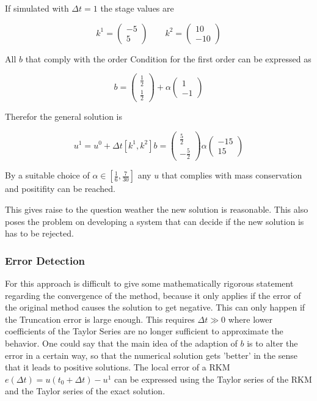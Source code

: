 \documentclass{article}
\begin{document}
If simulated with $\Delta t = 1$ the stage values are 

\begin{equation}
k^1 = \left(\begin{matrix}-5\\5\end{matrix}\right) \qquad k^2 = \left(\begin{matrix}10\\-10\end{matrix}\right)
\end{equation}

All $b$ that comply with the order Condition for the first order can be expressed as

\begin{equation}
b= \left(\begin{matrix}\frac{1}{2}\\ \frac{1}{2}\end{matrix}\right) + \alpha \left(\begin{matrix}1\\ -1\end{matrix}\right)
\end{equation}

Therefor the general solution is 

\begin{equation}
u^{1} = u^0 + \Delta t  \left[k^1,k^2\right] b = \left(\begin{matrix}\frac{5}{2}\\- \frac{5}{2}\end{matrix}\right) \alpha  \left(\begin{matrix}-15\\15\end{matrix}\right)
\end{equation}

By a suitable choice of $\alpha \in [\frac{1}{6},\frac{7}{30}]$ any $u$ that complies with mass conservation and positifity can be reached. 

This gives raise to the question weather the new solution is reasonable.
This also poses the problem on developing a system that can decide if the new solution is has to be rejected. 


 
\subsubsection{Error Detection}
For this approach is difficult to give some mathematically rigorous statement regarding the convergence of the method, because it only applies if the error of the original method causes the solution to get negative. This can only happen if the Truncation error is large enough. This requires $\Delta t \gg 0$ where lower coefficients of the Taylor Series are no longer sufficient to approximate the behavior. 
One could say that the main idea of the adaption of $b$ is to alter the error in a certain way, so that the numerical solution gets 'better' in the sense that it leads to positive solutions. 
The local error of a RKM $e(\Delta t) =u(t_0 + \Delta t) - u^1$ can be expressed using the Taylor series of the RKM and the Taylor series of the exact solution. %
\end{document}
